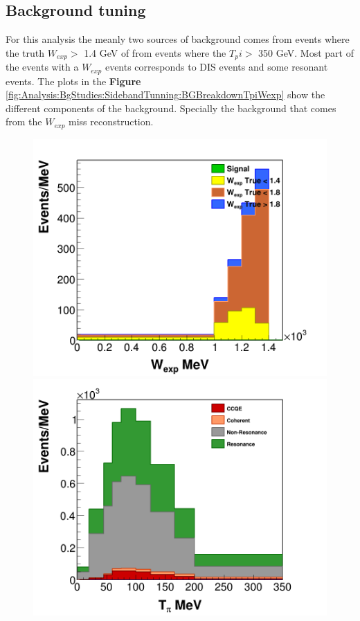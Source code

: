 \subsection{Background tuning}
\label{Cap:Analysis:BgStudies:SidebandTuning}
For this analysis the meanly two sources of background comes from events where the truth $W_{exp} >$ 1.4 GeV  of from events where the $T_pi > $ 350 GeV. Most part of the events with a $W_{exp}$ events corresponds to DIS events and some resonant events. The plots in the \textbf{Figure} \ref{fig:Analysis:BgStudies:SidebandTunning:BGBreakdownTpiWexp} show the different components of the background. Specially the background that comes from the $W_{exp}$ miss reconstruction. 

\begin{figure}[!htb]
    \centering
    \includegraphics[scale=0.2]{Figures/Chapter4/BGStudies/Bd_Background_wexp_WSB.png}
    \includegraphics[scale=0.2]{Figures/Chapter4/BGStudies/Bd_Background_mixtpi_Int.png}

\end{figure}
